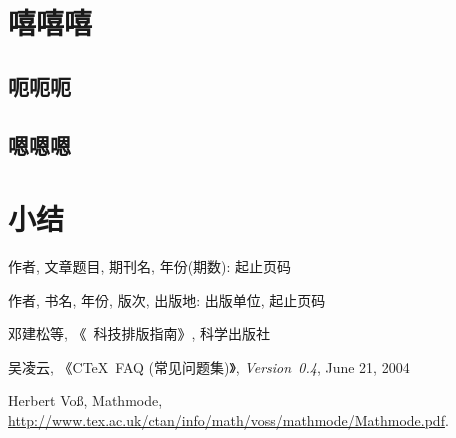 \documentclass[forlib]{HNUthesis}   %
\begin{document}
\chapter{嘻嘻嘻}

\section{呃呃呃}

\section{嗯嗯嗯}

\chapter{小结}

\cleardoublepage{}
{}
\begin{thebibliography}{000}

   作者, 文章题目, 期刊名, 年份(期数): 起止页码

   作者, 书名, 年份, 版次, 出版地: 出版单位, 起止页码

   邓建松等, 《\LaTeXe~科技排版指南》, 科学出版社

   吴凌云, 《CTeX~FAQ (常见问题集)》, \textit{Version~0.4}, June 21, 2004

   Herbert Vo\ss, Mathmode, \url{http://www.tex.ac.uk/ctan/info/math/voss/mathmode/Mathmode.pdf}.

\end{thebibliography}



\backmatter

\cleardoublepage
\end{document}
